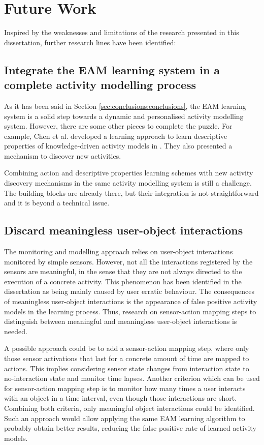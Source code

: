 \section{Future Work}
\label{sec:conclusions:future}

Inspired by the weaknesses and limitations of the research presented in this dissertation, further research lines have been identified:

\subsection{Integrate the EAM learning system in a complete activity modelling process}

As it has been said in Section \ref{sec:conclusions:conclusions}, the EAM learning system is a solid step towards a dynamic and personalised activity modelling system. However, there are some other pieces to complete the puzzle. For example, Chen et al. developed a learning approach to learn descriptive properties of knowledge-driven activity models in \cite{Chen2014}. They also presented a mechanism to discover new activities.

Combining action and descriptive properties learning schemes with new activity discovery mechanisms in the same activity modelling system is still a challenge. The building blocks are already there, but their integration is not straightforward and it is beyond a technical issue. 

\subsection{Discard meaningless user-object interactions}

The monitoring and modelling approach relies on user-object interactions monitored by simple sensors. However, not all the interactions registered by the sensors are meaningful, in the sense that they are not always directed to the execution of a concrete activity. This phenomenon has been identified in the dissertation as being mainly caused by user erratic behaviour. The consequences of meaningless user-object interactions is the appearance of false positive activity models in the learning process. Thus, research on sensor-action mapping steps to distinguish between meaningful and meaningless user-object interactions is needed.

A possible approach could be to add a sensor-action mapping step, where only those sensor activations that last for a concrete amount of time are mapped to actions. This implies considering sensor state changes from interaction state to no-interaction state and monitor time lapses. Another criterion which can be used for sensor-action mapping step is to monitor how many times a user interacts with an object in a time interval, even though those interactions are short. Combining both criteria, only meaningful object interactions could be identified. Such an approach would allow applying the same EAM learning algorithm to probably obtain better results, reducing the false positive rate of learned activity models.

